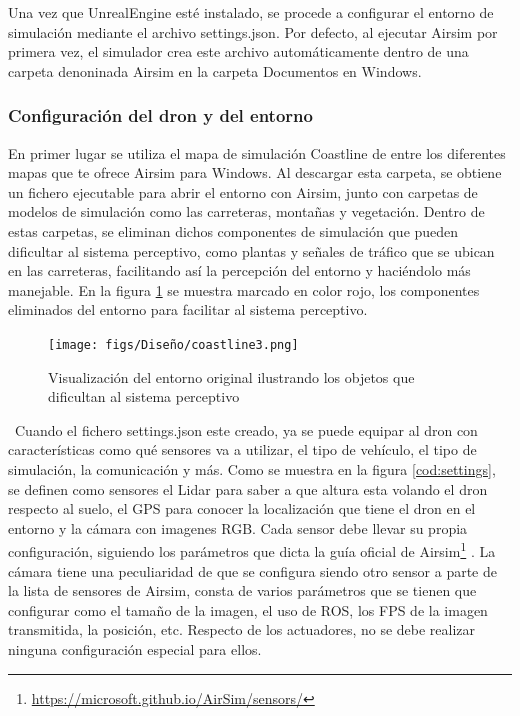 Una vez que UnrealEngine esté instalado, se procede a configurar el entorno de simulación mediante el archivo settings.json. Por defecto, al ejecutar Airsim 
por primera vez, el simulador crea este archivo automáticamente dentro de una carpeta denoninada Airsim en la carpeta Documentos en Windows. 


\subsubsection{Configuración del dron y del entorno}
\label{subsec:Configuración del dron y del entorno}

En primer lugar se utiliza el mapa de simulación Coastline de entre los diferentes mapas que te ofrece Airsim para Windows. Al descargar esta carpeta, 
se obtiene un fichero ejecutable para abrir el entorno con Airsim, junto con carpetas de modelos de simulación como las carreteras, montañas y vegetación. Dentro de estas carpetas, se eliminan dichos componentes 
de simulación que pueden dificultar al sistema perceptivo, como plantas y señales de tráfico que se ubican en las carreteras, facilitando así la percepción del entorno 
y haciéndolo más manejable. En la figura \ref{fig:CoastlineModificado} se muestra marcado en color rojo, los componentes eliminados del entorno para facilitar al sistema 
perceptivo.

\begin{figure} [H]
  \begin{center}
    \texttt{[image: figs/Diseño/coastline3.png]}
  \end{center}
  \caption{Visualización del entorno original ilustrando los objetos que dificultan al sistema perceptivo}
  \label{fig:CoastlineModificado}
\end{figure}\
Cuando el fichero settings.json este creado, ya se puede equipar al dron con características como qué sensores va a utilizar, 
el tipo de vehículo, el tipo de simulación, la comunicación y más. Como se muestra en la figura \ref{cod:settings}, se definen como sensores el Lidar para saber a que altura
esta volando el dron respecto al suelo, el GPS para conocer la localización que tiene el dron en el entorno y la cámara con imagenes
RGB. Cada sensor debe llevar su propia configuración, siguiendo los parámetros que dicta la guía oficial de Airsim\footnote{\url{https://microsoft.github.io/AirSim/sensors/}}
. La cámara tiene una peculiaridad de que se configura siendo otro sensor a parte de la lista de sensores de Airsim, consta de varios parámetros que se tienen que configurar como 
el tamaño de la imagen, el uso de ROS, los FPS de la imagen transmitida, la posición, etc. 
Respecto de los actuadores, no se debe realizar ninguna configuración especial para ellos.

